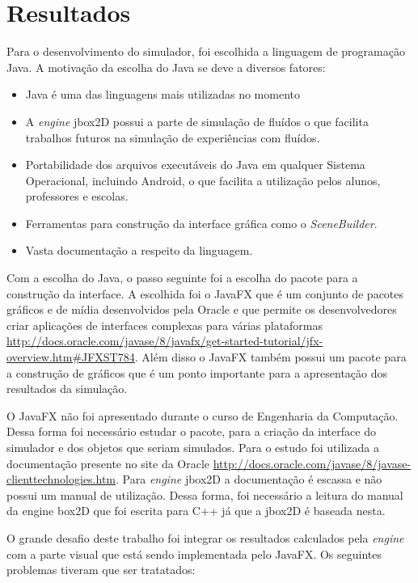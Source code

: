 \chapter{Resultados}

Para o desenvolvimento do simulador, foi escolhida a linguagem de programação Java. A motivação da escolha do Java se deve a diversos fatores:

\begin{itemize}
	\item Java é uma das linguagens mais utilizadas no momento
	\item A \textit{engine} jbox2D possui a parte de simulação de fluídos o que facilita trabalhos futuros na simulação de experiências com fluídos.
	\item Portabilidade dos arquivos executáveis do Java em qualquer Sistema Operacional, incluindo Android, o que facilita a utilização pelos alunos, professores e escolas.
	\item Ferramentas para construção da interface gráfica como o \textit{SceneBuilder}.
	\item Vasta documentação a respeito da linguagem.
\end{itemize}

Com a escolha do Java, o passo seguinte foi a escolha do pacote para a construção da interface. A escolhida foi o JavaFX que é um conjunto de pacotes gráficos e de mídia desenvolvidos pela Oracle e que permite os desenvolvedores criar aplicações de interfaces complexas para várias plataformas \url{http://docs.oracle.com/javase/8/javafx/get-started-tutorial/jfx-overview.htm#JFXST784}. Além disso o JavaFX também possui um pacote para a construção de gráficos que é um ponto importante para a apresentação dos resultados da simulação.

O JavaFX não foi apresentado durante o curso de Engenharia da Computação. Dessa forma foi necessário estudar o pacote, para a criação da interface do simulador e dos objetos que seriam simulados. Para o estudo foi utilizada a documentação presente no site da Oracle \url{http://docs.oracle.com/javase/8/javase-clienttechnologies.htm}. Para \textit{engine} jbox2D a documentação é escassa e não possui um manual de utilização. Dessa forma, foi necessário a leitura do manual da engine box2D que foi escrita para C++ já que a jbox2D é baseada nesta. 

O grande desafio deste trabalho foi integrar os resultados calculados pela \textit{engine} com a parte visual que está sendo implementada pelo JavaFX. Os seguintes problemas tiveram que ser tratatados:

